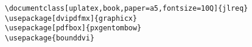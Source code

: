 \documentclass[uplatex,book,paper=a5,fontsize=10Q]{jlreq}
\begin{document}
\begin{verbatim}
\documentclass[uplatex,book,paper=a5,fontsize=10Q]{jlreq}
\usepackage[dvipdfmx]{graphicx}
\usepackage[pdfbox]{pxgentombow}
\usepackage{bounddvi}
\end{verbatim}
\end{document}
